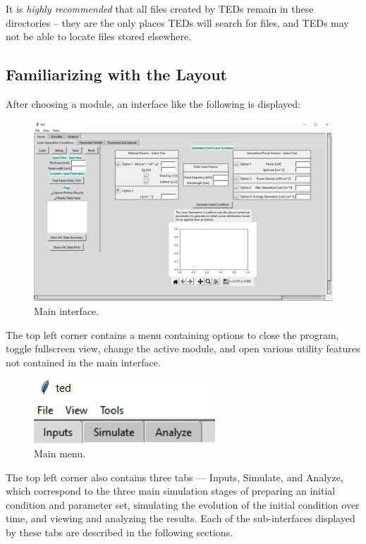 \documentclass[11pt,letterpaper,titlepage]{article}
\begin{document}
		\par
		It is \textit{highly recommended} that all files created by TEDs remain in these directories – they are the only places TEDs will search for files, and TEDs may not be able to locate files stored elsewhere.
		
		\subsection{Familiarizing with the Layout}
		
		\par
		After choosing a module, an interface like the following is displayed:
		\begin{figure}[H]
			\label{fig:main_interface}
			\centering
			\includegraphics[scale=0.4]{"main_interface"}
			\caption{Main interface.}
		\end{figure}
	
	    \par
	    The top left corner contains a menu containing options to close the program, toggle fullscreen view, change the active module, and open various utility features not contained in the main interface.
	    
	    \begin{figure}[H]
	    	\label{fig:top_left_menu}
	    	\centering
	    	\includegraphics[scale=1]{"top_left_menu"}
	    	\caption{Main menu.}
	    \end{figure}
	    
	    \par
	    The top left corner also contains three tabs — Inputs, Simulate, and Analyze, which correspond to the three main simulation stages of preparing an initial condition and parameter set, simulating the evolution of the initial condition over time, and viewing and analyzing the results. Each of the sub-interfaces displayed by these tabs are described in the following sections.
	    
\end{document}

